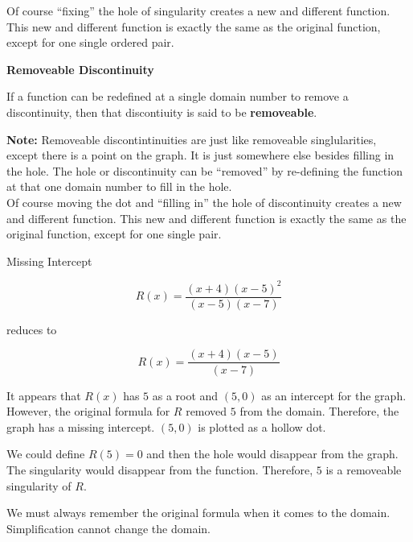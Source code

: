 \documentclass{ximera}
\begin{document}
Of course ``fixing'' the hole of singularity creates a new and different function.  This new and different function is exactly the same as the original function, except for one single ordered pair.







\begin{definition} \textbf{\textcolor{green!50!black}{Removeable Discontinuity}}

If a function can be redefined at a single domain number to remove a discontinuity, then that discontiuity is said to be \textbf{removeable}.

\end{definition}

\textbf{Note:} Removeable discontintinuities are just like removeable singlularities, except there is a point on the graph.  It is just somewhere else besides filling in the hole.  The hole or discontinuity can be ``removed'' by re-defining the function at that one domain number to fill in the hole.\\

Of course moving the dot and ``filling in'' the hole of discontinuity creates a new and different function.  This new and different function is exactly the same as the original function, except for one single pair.






\begin{example}  Missing Intercept

\[     R(x) = \frac{(x+4)(x-5)^2}{(x-5)(x-7)}     \]

reduces to 

\[     R(x) = \frac{(x+4)(x-5)}{(x-7)}     \]


It appears that $R(x)$ has $5$ as a root and $(5,0)$ as an intercept for the graph.  However, the original formula for $R$ removed $5$ from the domain.  Therefore, the graph has a missing intercept. $(5,0)$ is plotted as a hollow dot.



We could define $R(5)=0$ and then the hole would disappear from the graph.  The singularity would disappear from the function. Therefore, $5$ is a removeable singularity of $R$.


\end{example}

We must always remember the original formula when it comes to the domain.  Simplification cannot change the domain. \\
\end{document}
